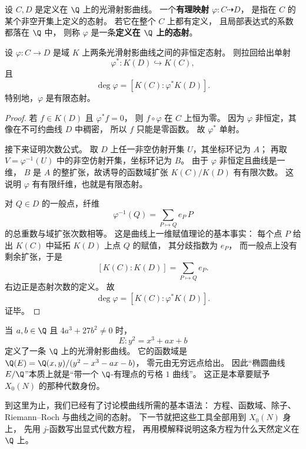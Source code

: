 \begin{definition}
\label{def:ch07-morphism-over-q}
设 $C,D$ 是定义在 $\Q$ 上的光滑射影曲线。
一个\textbf{有理映射} $\varphi:C\dashrightarrow D$，
是指在 $C$ 的某个非空开集上定义的态射。
若它在整个 $C$ 上都有定义，
且局部表达式的系数都落在 $\Q$ 中，
则称 $\varphi$ 是一条\textbf{定义在 $\Q$ 上的态射}。
\end{definition}

\begin{proposition}[曲线上的非恒定态射与函数域]
\label{prop:ch07-morphism-function-field}
设 $\varphi:C\to D$ 是域 $K$ 上两条光滑射影曲线之间的非恒定态射。
则拉回给出单射
\[
  \varphi^*:K(D)\hookrightarrow K(C),
\]
且
\[
  \deg \varphi=[K(C):\varphi^*K(D)].
\]
特别地，$\varphi$ 是有限态射。
\end{proposition}

\begin{proof}
若 $f\in K(D)$ 且 $\varphi^*f=0$，
则 $f\circ\varphi$ 在 $C$ 上恒为零。
因为 $\varphi$ 非恒定，其像在不可约曲线 $D$ 中稠密，
所以 $f$ 只能是零函数。
故 $\varphi^*$ 单射。

接下来证明次数公式。
取 $D$ 上任一非空仿射开集 $U$，其坐标环记为 $A$；
再取 $V=\varphi^{-1}(U)$ 中的非空仿射开集，坐标环记为 $B$。
由于 $\varphi$ 非恒定且曲线是一维，
$B$ 是 $A$ 的整扩张，故诱导的函数域扩张 $K(C)/K(D)$ 有有限次数。
这说明 $\varphi$ 有有限纤维，也就是有限态射。

对 $Q\in D$ 的一般点，纤维
\[
  \varphi^{-1}(Q)=\sum_{P\mapsto Q} e_P\,P
\]
的总重数与域扩张次数相等。
这是曲线上一维赋值理论的基本事实：
每个点 $P$ 给出 $K(C)$ 中延拓 $K(D)$ 上点 $Q$ 的赋值，
其分歧指数为 $e_P$，
而一般点上没有剩余扩张，于是
\[
  [K(C):K(D)]=\sum_{P\mapsto Q} e_P.
\]
右边正是态射次数的定义。
故
\[
  \deg\varphi=[K(C):\varphi^*K(D)].
\]
证毕。
\end{proof}

\begin{example}
\label{ex:ch07-elliptic-over-q}
当 $a,b\in\Q$ 且 $4a^3+27b^2\neq 0$ 时，
\[
  E: y^2=x^3+ax+b
\]
定义了一条 $\Q$ 上的光滑射影曲线。
它的函数域是 $\Q(E)=\Q(x,y)/(y^2-x^3-ax-b)$，
零元由无穷远点给出。
因此“椭圆曲线 $E/\Q$”本质上就是“带一个 $\Q$-有理点的亏格 $1$ 曲线”。
这正是本章要赋予 $X_0(N)$ 的那种代数身份。
\end{example}

到这里为止，我们已经有了讨论模曲线所需的基本语法：
方程、函数域、除子、Riemann--Roch 与曲线之间的态射。
下一节就把这些工具全部用到 $X_0(N)$ 身上，
先用 $j$-函数写出显式代数方程，
再用模解释说明这条方程为什么天然定义在 $\Q$ 上。
